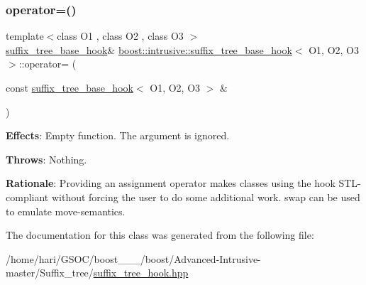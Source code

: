 \subsubsection{\texorpdfstring{operator=()}{operator=()}}
{\footnotesize\ttfamily template$<$class O1 , class O2 , class O3 $>$ \\
\hyperlink{classboost_1_1intrusive_1_1suffix__tree__base__hook}{suffix\+\_\+tree\+\_\+base\+\_\+hook}\& \hyperlink{classboost_1_1intrusive_1_1suffix__tree__base__hook}{boost\+::intrusive\+::suffix\+\_\+tree\+\_\+base\+\_\+hook}$<$ O1, O2, O3 $>$\+::operator= (\begin{DoxyParamCaption}\item[{const \hyperlink{classboost_1_1intrusive_1_1suffix__tree__base__hook}{suffix\+\_\+tree\+\_\+base\+\_\+hook}$<$ O1, O2, O3 $>$ \&}]{ }\end{DoxyParamCaption})}

{\bfseries Effects}\+: Empty function. The argument is ignored.

{\bfseries Throws}\+: Nothing.

{\bfseries Rationale}\+: Providing an assignment operator makes classes using the hook S\+T\+L-\/compliant without forcing the user to do some additional work. {\ttfamily swap} can be used to emulate move-\/semantics. 

The documentation for this class was generated from the following file\+:\begin{DoxyCompactItemize}
\item 
/home/hari/\+G\+S\+O\+C/boost\+\_\+\_\+\_/boost/\+Advanced-\/\+Intrusive-\/master/\+Suffix\+\_\+tree/\hyperlink{suffix__tree__hook_8hpp}{suffix\+\_\+tree\+\_\+hook.\+hpp}\end{DoxyCompactItemize}

